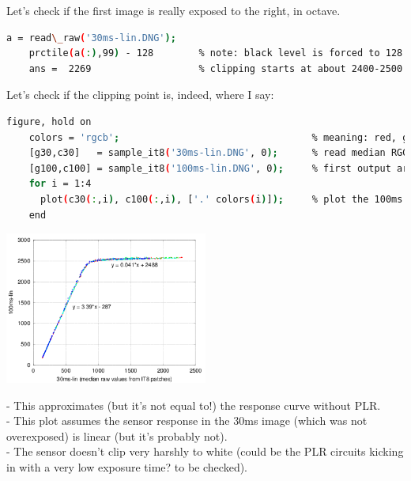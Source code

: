 Let's check if the first image is really exposed to the right, in octave.  

\begin{lstlisting}[language=bash,morekeywords=$,keywordstyle=\bfseries,frame=none,xleftmargin=.25in,belowskip=2em, aboveskip=2em]
    a = read\_raw('30ms-lin.DNG');
    prctile(a(:),99) - 128        % note: black level is forced to 128 in raw2dng
    ans =  2269                   % clipping starts at about 2400-2500 above black
\end{lstlisting}

Let's check if the clipping point is, indeed, where I say: 

\begin{lstlisting}[language=bash,morekeywords=$,keywordstyle=\bfseries,frame=none,xleftmargin=.25in,belowskip=2em, aboveskip=2em]
    figure, hold on
    colors = 'rgcb';                                  % meaning: red, gren1, green2 (plotted as cyan), blue (raw data from Bayer channels)
    [g30,c30]   = sample_it8('30ms-lin.DNG', 0);      % read median RGGB swatch values from IT8 chart
    [g100,c100] = sample_it8('100ms-lin.DNG', 0);     % first output arg is grayscale, second is full color, each column is a Bayer channel
    for i = 1:4
      plot(c30(:,i), c100(:,i), ['.' colors(i)]);     % plot the 100ms image vs the 30ms one (extremely rough guess for response curve)
    end
\end{lstlisting}

\begin{center}
\includegraphics[height=5cm]{images/100ms-vs-30ms-lin}
\end{center}

- This approximates (but it's not equal to!) the response curve without PLR.\\
- This plot assumes the sensor response in the 30ms image (which was not overexposed) is linear (but it's probably not).\\
- The sensor doesn't clip very harshly to white (could be the PLR circuits kicking in with a very low exposure time? to be checked).\\

